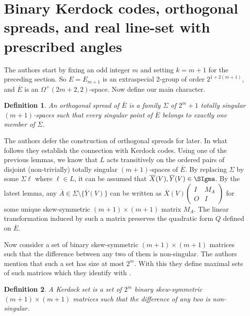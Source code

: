 \documentclass[a4paper]{article}
\newtheorem{definition}{Definition}
\begin{document}
  \section{Binary Kerdock codes, orthogonal spreads, and
  real line-set with prescribed angles}

  The authors start by fixing an odd integer $m$ and setting
  $k = m + 1$ for the preceding section. So $E = E_{m+1}$ is
  an extraspecial 2-group of order $2^{1+2(m+1)}$, and
  $\overline{E}$ is an $\Omega^{+}(2m+2,2)$-space. Now
  define our main character.

  \begin{definition}
    An orthogonal spread of $\overline{E}$ is a family
    $\Sigma$ of $2^{m}+1$ totally singular $(m+1)$-spaces
    such that every singular point of $\overline{E}$ belongs
    to exactly one member of $\Sigma$.
  \end{definition}

  The authors defer the construction of orthogonal spreads
  for later. In what follows they establish the connection
  with Kerdock codes. Using one of the previous lemmas, we
  know that $L$ acts transitively on the ordered pairs of
  disjoint (non-trivially) totally singular $(m+1)$-spaces
  of $\overline{E}$. By replacing $\Sigma$ by some $\Sigma
  \ell$ where $\ell \in L$, it can be assumed that
  $\overline{X}(V), \overline{Y}(V) \in \SIgma$. By the
  latest lemma, any $\overline{A} \in \Sigma \setminus
  \{\overline{Y}(V)\}$ can be written as $\overline{X}(V)
  \begin{pmatrix} I & M_A \\ O & I \end{pmatrix}$ for some
  unique skew-symmetric $(m+1) \times (m+1)$ matrix $M_A$.
  The linear transformation induced by such a matrix
  preserves the quadratic form $Q$ defined on $\overline{E}$.

  Now consider a set of binary skew-symmetric $(m+1) \times
  (m+1)$ matrices such that the difference between any two
  of them is non-singular. The authors mention that such a
  set has size at most $2^{m}$. With this they define
  maximal sets of such matrices which they identify with
  .

  \begin{definition}
    A Kerdock set is a set of $2^{m}$ binary skew-symmetric
    $(m+1) \times (m+1)$ matrices such that the difference
    of any two is non-singular.
  \end{definition}
\end{document}
